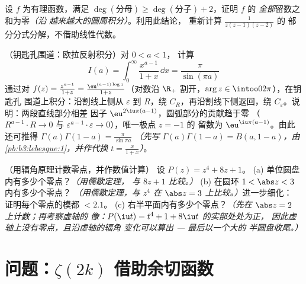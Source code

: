 \begin{exercise}[$\star\star$]\label{exo:b3:residues:10}
设 $f$ 为有理函数，满足 $\deg(\text{分母})
\geq \deg(\text{分子}) + 2$，证明 $f$ 的
\emph{全部}留数之和为零\emph{（沿
越来越大的圆周积分）}。利用此结论，
重新计算 $\frac1{z(z-1)(z-2)}$ 的
部分分式分解，不借助线性代数。
\end{exercise}

\begin{exercise}[$\star\star\star$]\label{exo:b3:residues:11}
（钥匙孔围道：欧拉反射积分）对 $0 < a < 1$，
计算
\[
I(a) = \int_0^{\infty}\frac{x^{a-1}}{1 + x}\,\dd x =
\frac{\pi}{\sin(\pi a)}
\]
通过对 $f(z) = \frac{z^{a-1}}{1+z} =
\frac{\eu^{(a-1)\log z}}{1 + z}$（对数沿
$\R_+$ 割开，$\arg z \in \intoo0{2\pi}$），在钥匙孔
围道上积分：沿割线上侧从 $\varepsilon$ 到
$R$，绕 $C_R$，再沿割线下侧返回，绕
$C_\varepsilon$。说明：两段直线部分相差
因子 $\eu^{2\iu\pi(a-1)}$，圆弧部分的贡献趋于零
（$R^{a-1}\cdot R \to 0$ 与
$\varepsilon^{a-1}\cdot\varepsilon \to 0$），唯一极点 $z = -1$ 的
留数为 $\eu^{\iu\pi(a - 1)}$。由此还可推得
$\Gamma(a)\Gamma(1 - a) = \frac\pi{\sin\pi a}$ \emph{（先写
$\Gamma(a)\Gamma(1-a) = B(a, 1-a)$，由
\cref{pb:b3:lebesgue:1}，并作代换 $t =
\frac{x}{1+x}$）}。
\end{exercise}

\begin{exercise}[$\star\star$]\label{exo:b3:residues:12}
（用辐角原理计数零点，并作数值计算）
设 $P(z) = z^4 + 8z + 1$。
(a) 单位圆盘内有多少个零点？\emph{（用儒歇定理，
与 $8z + 1$ 比较。）}
(b) 在圆环 $1 < \abs z < 3$ 内有多少个零点？
\emph{（用儒歇定理，与 $z^4$ 在 $\abs z = 3$ 上比较。）}进一步细化：
证明每个零点的模都 $< 2.1$。
(c) 右半平面内有多少个零点？\emph{（先在
$\abs z = 2$ 上计数；再考察虚轴的
像：$P(\iu t) = t^4 + 1 + 8\iu t$ 的实部处处为正，
因此虚轴上没有零点，且沿虚轴的辐角
变化可以算出 --- 最后以一个大的
半圆盘收尾。）}
\end{exercise}

\section{问题：\texorpdfstring{$\zeta(2k)$}{zeta(2k)}
借助余切函数}

